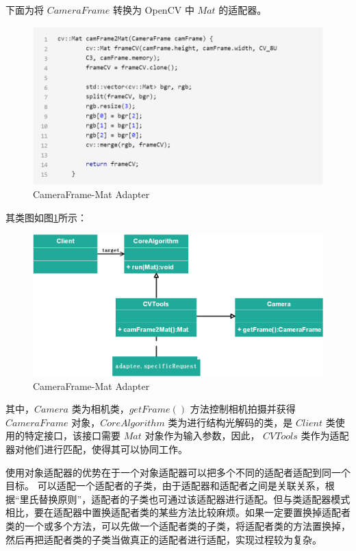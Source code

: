 \documentclass[article]{BJTU-thesis}
\begin{document}
下面为将 $CameraFrame$ 转换为 OpenCV 中 $Mat$ 的适配器。
	 	\begin{figure}[!htbp]
	\centering
	\includegraphics[scale=0.8]{12.png}
	\caption{CameraFrame-Mat Adapter}
\end{figure}

其类图如图\ref{fig:fig4}所示：
	 	\begin{figure}[!htbp]
	\centering
	\includegraphics[scale=0.5]{14.png}
	\caption{CameraFrame-Mat Adapter}
	\label{fig:fig4}
\end{figure}

其中，$Camera$ 类为相机类，$getFrame()$ 方法控制相机拍摄并获得 $CameraFrame$ 对象，$CoreAlgorithm$ 类为进行结构光解码的类，是 $Client$ 类使用的特定接口，该接口需要 $Mat$ 对象作为输入参数，因此， $CVTools$ 类作为适配器对他们进行匹配，使得其可以协同工作。

使用对象适配器的优势在于一个对象适配器可以把多个不同的适配者适配到同一个目标。
可以适配一个适配者的子类，由于适配器和适配者之间是关联关系，根据“里氏替换原则”，适配者的子类也可通过该适配器进行适配。但与类适配器模式相比，要在适配器中置换适配者类的某些方法比较麻烦。如果一定要置换掉适配者类的一个或多个方法，可以先做一个适配者类的子类，将适配者类的方法置换掉，然后再把适配者类的子类当做真正的适配者进行适配，实现过程较为复杂。
\end{document}
